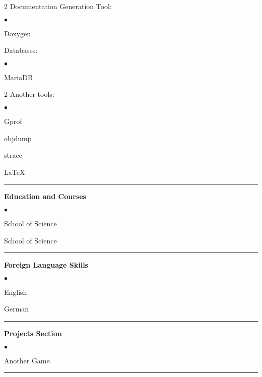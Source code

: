 \documentclass[oneside,final,12pt]{extreport}
\newenvironment{compactlist}{
	\begin{list}{{$\bullet$}}{
		\setlength\leftmargin{0.4cm}
		\setlength\partopsep{0pt}
		\setlength\parskip{0pt}
		\setlength\parsep{0pt}
		\setlength\topsep{0pt}
		\setlength\itemsep{0pt}
	}
}{
	\end{list}
}
\begin{document}
\begin{multicols}{2}
	Documentation Generation Tool:
	\begin{compactlist}
		\item Doxygen
	\end{compactlist}
	Databases:
	\begin{compactlist}
		 \item MariaDB
	\end{compactlist}
\end{multicols}

\begin{multicols}{2}
	Another tools:
	\begin{compactlist}
		\item Gprof
		\item objdump
		\item strace
		\item LaTeX
	\end{compactlist}
\end{multicols}
\rule{\textwidth}{0.4pt}

\bfseries
Education and Courses
\mdseries
\begin{compactlist}
	\item School of Science
	\item School of Science
\end{compactlist}
\rule{\textwidth}{0.4pt}

\bfseries
Foreign Language Skills
\mdseries
\begin{compactlist}
	\item English
	\item German
\end{compactlist}
\rule{\textwidth}{0.4pt}

\bfseries
Projects Section
\mdseries
\begin{compactlist}
	\item Another Game
\end{compactlist}
\rule{\textwidth}{0.4pt}
\end{document}
